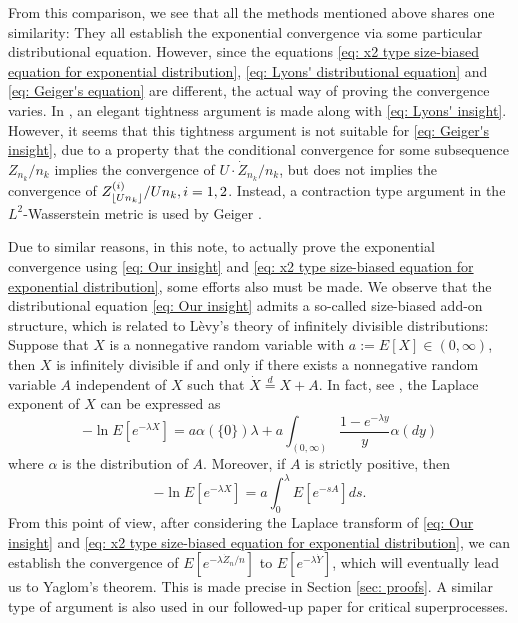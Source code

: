 \documentclass[12pt,a4paper]{amsart}
\DeclarePairedDelimiter\floor{\lfloor}{\rfloor}
\numberwithin{equation}{section}
\begin{document}
	From this comparison, we see that all the methods mentioned above shares one similarity: They all establish the exponential convergence via some particular distributional equation.
	However, since the equations \eqref{eq: x2 type size-biased equation for exponential distribution}, \eqref{eq: Lyons' distributional equation} and \eqref{eq: Geiger's equation} are different, the actual way of proving the convergence varies.
	In \cite{lyons1995conceptual}, an elegant tightness argument is made along with \eqref{eq: Lyons' insight}.
	However, it seems that this tightness argument is not suitable for \eqref{eq: Geiger's insight}, due to a property that the conditional convergence for some subsequence $Z_{n_k}/n_k$ implies the convergence of $U \cdot \dot Z_{n_k}/n_k$, 
   	but does not implies the convergence of $Z^{(i)}_{ \floor{Un_k}}/Un_k, i=1, 2$.
	Instead, a contraction type argument in the $L^2$-Wasserstein metric is used by Geiger \cite{geiger2000new}.
	
	Due to similar reasons, in this note,
	to actually prove the exponential convergence using \eqref{eq: Our insight} and \eqref{eq: x2 type size-biased equation for exponential distribution}, some efforts also must be made.
	We observe that the distributional equation \eqref{eq: Our insight} admits 
    a so-called size-biased add-on structure, which is related to L\`evy's 
	theory of infinitely divisible distributions: Suppose that $X$ is a nonnegative random variable with $ a := E [X]\in (0,\infty)$,
	then $X$ is infinitely divisible if and only if there exists a nonnegative random variable $A$ independent of $X$ such that $\dot X 	\overset{d} = X + A$.
	In fact, see \cite[Theorem 10.1]{ArratiaGoldsteinKochman2013}, the Laplace exponent of $X$ can be expressed as
\[
	-\ln E[ e^{-\lambda X}]
	 =  a \alpha(\{0\}) \lambda+ a \int_{(0,\infty)} \frac{1 - e^{-\lambda y}}{y} \alpha(dy)
\]
	where $\alpha$ is the distribution of $A$.
	Moreover, if $A$ is strictly positive, then
\begin{equation}\label{eq: Laplace exponent for size-biased add-on equation}
	-\ln E[ e^{-\lambda X}]
	=  a  \int_0^\lambda E [e^{-s A}] ds.
\end{equation}
	From this point of view, after considering the Laplace transform of \eqref{eq: Our insight} and \eqref{eq: x2 type size-biased equation for exponential distribution}, we can establish the convergence of $E[e^{-\lambda \dot Z_n/n}]$ to $E[e^{-\lambda \dot {Y}}]$, which will eventually lead us to Yaglom's theorem.
	This is made precise in Section \ref{sec: proofs}.
	A similar type of argument is also  used in our followed-up paper \cite{RenSongSun2017Spine}%
	for critical superprocesses.
	
\end{document}
